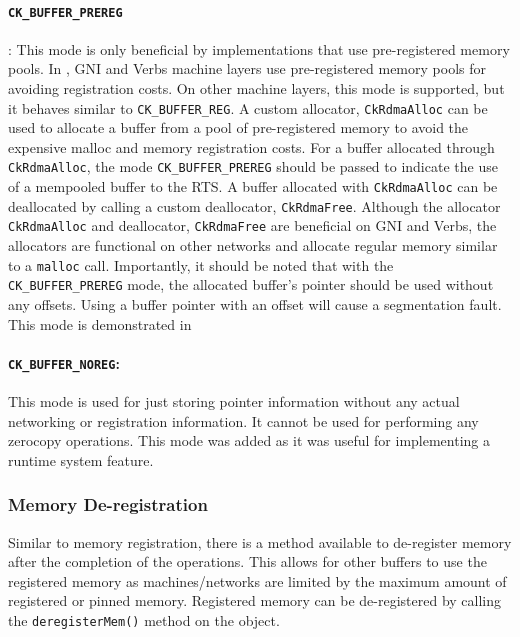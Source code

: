 \paragraph{{\tt CK\_BUFFER\_PREREG}}:
This mode is only beneficial by implementations that use pre-registered memory pools.
In \charmpp{}, GNI and Verbs machine layers use pre-registered memory pools for avoiding
registration costs. On other machine layers, this mode is supported, but it behaves similar
to {\tt CK\_BUFFER\_REG}. A custom allocator, \texttt{CkRdmaAlloc}
can be used to allocate a buffer from a pool of pre-registered memory to avoid the expensive malloc
and memory registration costs. For a buffer allocated through \texttt{CkRdmaAlloc}, the mode
{\tt CK\_BUFFER\_PREREG} should be passed to indicate the use of a
mempooled buffer to the RTS. A buffer allocated with \texttt{CkRdmaAlloc} can be deallocated by
calling a custom deallocator, \texttt{CkRdmaFree}. Although the allocator \texttt{CkRdmaAlloc} and
deallocator, \texttt{CkRdmaFree} are beneficial on GNI and Verbs, the allocators are functional on other
networks and allocate regular memory similar to a \texttt{malloc} call. Importantly, it should be
noted that with the {\tt CK\_BUFFER\_PREREG} mode, the allocated buffer's pointer should be used
without any offsets. Using a buffer pointer with an offset will cause a segmentation fault.
This mode is demonstrated in 

\paragraph{{\tt CK\_BUFFER\_NOREG}:}
This mode is used for just storing pointer information without any actual networking
or registration information. It cannot be used for performing any zerocopy operations.
This mode was added as it was useful for implementing a runtime system feature.

\subsubsection{Memory De-registration}
Similar to memory registration, there is a method available to de-register
memory after the completion of the operations. This allows for other buffers to use the
registered memory as machines/networks are limited by the maximum amount of registered or
pinned memory. Registered memory can be de-registered by calling the \texttt{deregisterMem()}
method on the  object.

